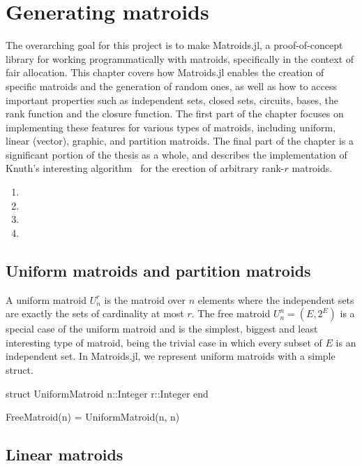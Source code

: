 \chapter{Generating matroids}
\label{chap:generating_matroids}
The overarching goal for this project is to make Matroids.jl, a proof-of-concept library for working programmatically with matroids, specifically in the context of fair allocation. This chapter covers how Matroids.jl enables the creation of specific matroids and the generation of random ones, as well as how to access important properties such as independent sets, closed sets, circuits, bases, the rank function and the closure function. The first part of the chapter focuses on implementing these features for various types of matroids, including uniform, linear (vector), graphic, and partition matroids. The final part of the chapter is a significant portion of the thesis as a whole, and describes the implementation of Knuth's interesting algorithm~\cite{knuth-1975} for the erection of arbitrary rank-$r$ matroids.

\begin{enumerate}
  \item {}
  \item {}
  \item {}
  \item {}
\end{enumerate}


\section{Uniform matroids and partition matroids}
A uniform matroid $U_n^r$ is the matroid over $n$ elements where the independent sets are exactly the sets of cardinality at most $r$. The free matroid $U_n^n = (E, 2^E)$ is a special case of the uniform matroid and is the simplest, biggest and least interesting type of matroid, being the trivial case in which every subset of $E$ is an independent set. In Matroids.jl, we represent uniform matroids with a simple struct.

\begin{jllisting}
struct UniformMatroid
  n::Integer
  r::Integer
end

FreeMatroid(n) = UniformMatroid(n, n)
\end{jllisting}


\section{Linear matroids}

